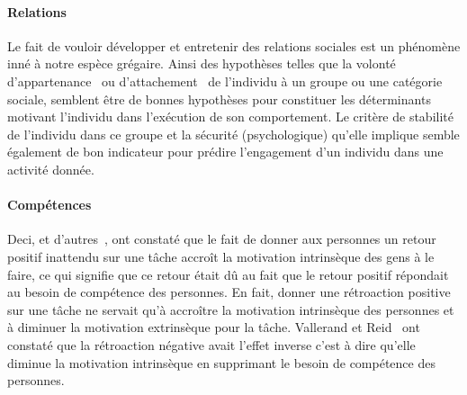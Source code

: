         \paragraph{Relations}
            Le fait de vouloir développer et entretenir des relations sociales est un phénomène inné à notre espèce grégaire. Ainsi des hypothèses telles que la volonté d'appartenance~ ou d'attachement~ de l'individu à un groupe ou une catégorie sociale, semblent être de bonnes hypothèses pour constituer les déterminants motivant l'individu dans l'exécution de son comportement. Le critère de stabilité de l'individu dans ce groupe et la sécurité (psychologique) qu'elle implique semble également de bon indicateur pour prédire l'engagement d'un individu dans une activité donnée.
        \paragraph{Compétences}
            Deci, et d'autres~, ont constaté que le fait de donner aux personnes un retour positif inattendu sur une tâche accroît la motivation intrinsèque des gens à le faire, ce qui signifie que ce retour était dû au fait que le retour positif répondait au besoin de compétence des personnes. En fait, donner une rétroaction positive sur une tâche ne servait qu'à accroître la motivation intrinsèque des personnes et à diminuer la motivation extrinsèque pour la tâche.
            Vallerand et Reid~ ont constaté que la rétroaction négative avait l'effet inverse c'est à dire qu'elle diminue la motivation intrinsèque en supprimant le besoin de compétence des personnes.
